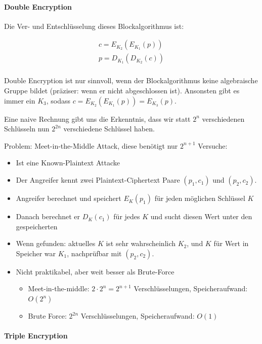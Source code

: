 \paragraph{Double Encryption}

Die Ver- und Entschlüsselung dieses Blockalgorithmus ist:

\begin{align*}
    c = E_{K_2}\left( E_{K_1}(p) \right) \\
    p = D_{K_1}\left( D_{K_2}(c) \right) \\
\end{align*}

Double Encryption ist nur sinnvoll, wenn der Blockalgorithmus keine algebraische Gruppe bildet (präziser: wenn er nicht abgeschlossen ist). Ansonsten gibt es immer ein 
$K_3$, sodass $c = E_{K_2}\left( E_{K_1}(p) \right) = E_{K_3}(p)$.

Eine naive Rechnung gibt uns die Erkenntnis, dass wir statt $2^n$ verschiedenen Schlüsseln nun $2^{2n}$ verschiedene Schlüssel haben.

Problem: Meet-in-the-Middle Attack, diese benötigt nur $2^{n+1}$ Versuche:

\begin{itemize}
    \item Ist eine Known-Plaintext Attacke 
    \item Der Angreifer kennt zwei Plaintext-Ciphertext Paare $(p_1, c_1)$ und $(p_2, c_2)$.
    \item Angreifer berechnet und speichert $E_K(p_1)$ für jeden möglichen Schlüssel $K$
    \item Danach berechnet er $D_K(c_1)$ für jedes $K$ und sucht diesen Wert unter den gespeicherten
    \item Wenn gefunden: aktuelles $K$ ist sehr wahrscheinlich $K_2$, und $K$ für Wert in Speicher war $K_1$, nachprüfbar mit $(p_2, c_2)$.
    \item Nicht praktikabel, aber weit besser als Brute-Force
    \begin{itemize}
        \item Meet-in-the-middle: $2\cdot 2^n = 2^{n+1}$ Verschlüsselungen, Speicheraufwand: $O(2^n)$
        \item Brute Force: $2^{2n}$ Verschlüsselungen, Speicheraufwand: $O(1)$
    \end{itemize}
\end{itemize}

\paragraph{Triple Encryption}

